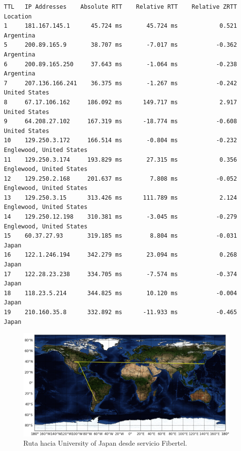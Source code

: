 \documentclass[10pt, a4paper]{article}
\begin{document}
\begin{verbatim}
TTL   IP Addresses    Absolute RTT    Relative RTT    Relative ZRTT  Location
1     181.167.145.1      45.724 ms       45.724 ms            0.521  Argentina
5     200.89.165.9       38.707 ms       -7.017 ms           -0.362  Argentina
6     200.89.165.250     37.643 ms       -1.064 ms           -0.238  Argentina
7     207.136.166.241    36.375 ms       -1.267 ms           -0.242  United States
8     67.17.106.162     186.092 ms      149.717 ms            2.917  United States
9     64.208.27.102     167.319 ms      -18.774 ms           -0.608  United States
10    129.250.3.172     166.514 ms       -0.804 ms           -0.232  Englewood, United States
11    129.250.3.174     193.829 ms       27.315 ms            0.356  Englewood, United States
12    129.250.2.168     201.637 ms        7.808 ms           -0.052  Englewood, United States
13    129.250.3.15      313.426 ms      111.789 ms            2.124  Englewood, United States
14    129.250.12.198    310.381 ms       -3.045 ms           -0.279  Englewood, United States
15    60.37.27.93       319.185 ms        8.804 ms           -0.031  Japan
16    122.1.246.194     342.279 ms       23.094 ms            0.268  Japan
17    122.28.23.238     334.705 ms       -7.574 ms           -0.374  Japan
18    118.23.5.214      344.825 ms       10.120 ms           -0.004  Japan
19    210.160.35.8      332.892 ms      -11.933 ms           -0.465  Japan
\end{verbatim}

\begin{figure}[H] %
\begin{center}
\includegraphics[width=400pt]{../imgs/map-iuj.png}
\caption{Ruta hacia University of Japan desde servicio Fibertel.}
\end{center}
\end{figure}
\end{document}
